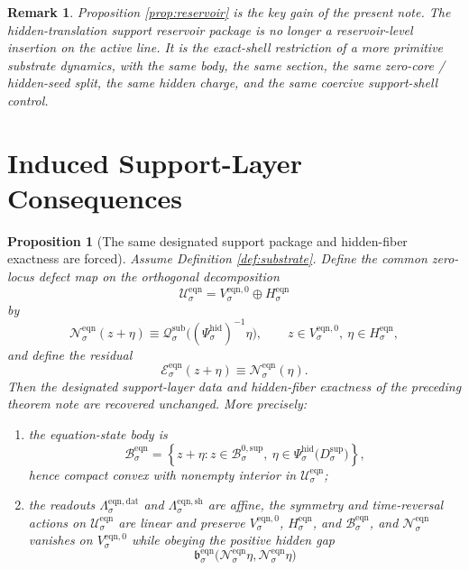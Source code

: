 \documentclass[11pt]{article}
\newcommand{\EqnSpace}[1]{\mathcal U_{#1}^{\mathrm{eqn}}}
\newcommand{\EqnBody}[1]{\mathcal B_{#1}^{\mathrm{eqn}}}
\newcommand{\EqnData}[1]{\Lambda_{#1}^{\mathrm{eqn,dat}}}
\newcommand{\EqnShell}[1]{\Lambda_{#1}^{\mathrm{eqn,sh}}}
\newcommand{\EqnPair}[1]{\mathfrak b_{#1}^{\mathrm{eqn}}}
\newcommand{\EqnResidual}[1]{\mathcal E_{#1}^{\mathrm{eqn}}}
\newcommand{\EqnZero}[1]{V_{#1}^{\mathrm{eqn},0}}
\newcommand{\EqnHidden}[1]{H_{#1}^{\mathrm{eqn}}}
\newcommand{\EqnLin}[1]{\mathcal N_{#1}^{\mathrm{eqn}}}
\newcommand{\SeedHiddenBody}[1]{D_{#1}^{\mathrm{sup}}}
\newcommand{\HiddenChart}[1]{\Psi_{#1}^{\mathrm{hid}}}
\newcommand{\ZeroBody}[1]{\mathcal B_{#1}^{0,\mathrm{sup}}}
\newcommand{\SubCharge}[1]{\mathcal Q_{#1}^{\mathrm{sub}}}
\newtheorem{proposition}{Proposition}
\newtheorem{remark}{Remark}
\begin{document}
\begin{remark}
Proposition \ref{prop:reservoir} is the key gain of the present note. The hidden-translation support reservoir package is no longer a reservoir-level insertion on the active line. It is the exact-shell restriction of a more primitive substrate dynamics, with the same body, the same section, the same zero-core / hidden-seed split, the same hidden charge, and the same coercive support-shell control.
\end{remark}

\section{Induced Support-Layer Consequences}

\begin{proposition}[The same designated support package and hidden-fiber exactness are forced]
\label{prop:support}
Assume Definition \ref{def:substrate}. Define the common zero-locus defect map on the orthogonal decomposition
\[
\EqnSpace{\sigma}=\EqnZero{\sigma}\oplus\EqnHidden{\sigma}
\]
by
\begin{equation}
\EqnLin{\sigma}(z+\eta)
\equiv
\SubCharge{\sigma}\bigl((\HiddenChart{\sigma})^{-1}\eta\bigr),
\qquad
z\in\EqnZero{\sigma},
\ \eta\in\EqnHidden{\sigma},
\label{eq:inducedlin}
\end{equation}
and define the residual
\begin{equation}
\EqnResidual{\sigma}(z+\eta)
\equiv
\EqnLin{\sigma}(\eta).
\label{eq:inducedresidual}
\end{equation}
Then the designated support-layer data and hidden-fiber exactness of the preceding theorem note are recovered unchanged. More precisely:
\begin{enumerate}
    \item the equation-state body is
    \[
    \EqnBody{\sigma}
    =
    \left\{
    z+\eta:
    z\in\ZeroBody{\sigma},
    \ \eta\in\HiddenChart{\sigma}\bigl(\SeedHiddenBody{\sigma}\bigr)
    \right\},
    \]
    hence compact convex with nonempty interior in \(\EqnSpace{\sigma}\);
    \item the readouts \(\EqnData{\sigma}\) and \(\EqnShell{\sigma}\) are affine, the symmetry and time-reversal actions on \(\EqnSpace{\sigma}\) are linear and preserve \(\EqnZero{\sigma}\), \(\EqnHidden{\sigma}\), and \(\EqnBody{\sigma}\), and \(\EqnLin{\sigma}\) vanishes on \(\EqnZero{\sigma}\) while obeying the positive hidden gap
    \begin{equation}
    \EqnPair{\sigma}\bigl(\EqnLin{\sigma}\eta,\EqnLin{\sigma}\eta\bigr)

\end{equation}
\end{enumerate}
\end{proposition}
\end{document}
